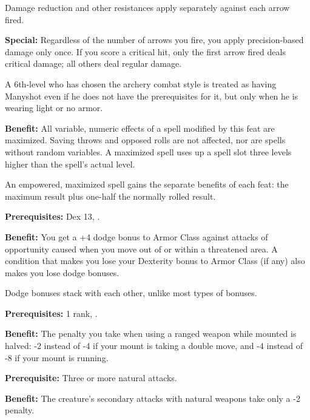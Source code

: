 Damage reduction and other resistances apply separately against each arrow fired.

\textbf{Special:} Regardless of the number of arrows you fire, you apply precision-based damage only once. If you score a critical hit, only the first arrow fired deals critical damage; all others deal regular damage.

A 6th-level  who has chosen the archery combat style is treated as having Manyshot even if he does not have the prerequisites for it, but only when he is wearing light or no armor.


\textbf{Benefit:} All variable, numeric effects of a spell modified by this feat are maximized. Saving throws and opposed rolls are not affected, nor are spells without random variables. A maximized spell uses up a spell slot three levels higher than the spell's actual level.

An empowered, maximized spell gains the separate benefits of each feat: the maximum result plus one-half the normally rolled result.


\textbf{Prerequisites:} Dex 13, .

\textbf{Benefit:} You get a +4 dodge bonus to Armor Class against attacks of opportunity caused when you move out of or within a threatened area. A condition that makes you lose your Dexterity bonus to Armor Class (if any) also makes you lose dodge bonuses.

Dodge bonuses stack with each other, unlike most types of bonuses.


\textbf{Prerequisites:}  1 rank, .

\textbf{Benefit:} The penalty you take when using a ranged weapon while mounted is halved: -2 instead of -4 if your mount is taking a double move, and -4 instead of -8 if your mount is running.


\textbf{Prerequisite:} Three or more natural attacks.

\textbf{Benefit:} The creature's secondary attacks with natural weapons take only a -2 penalty.


